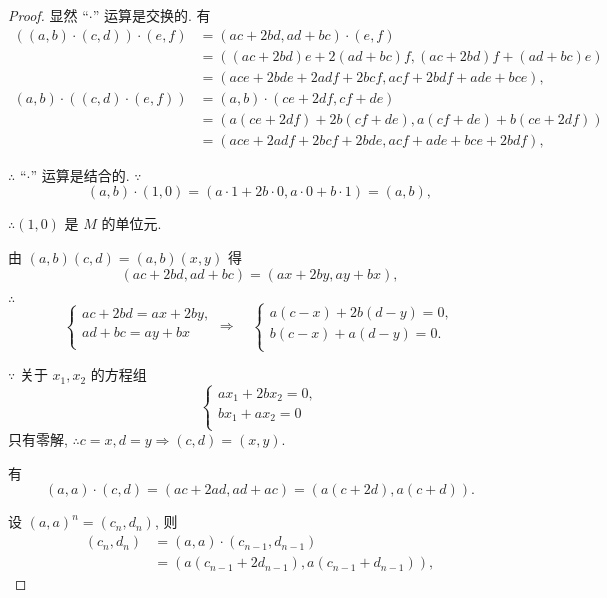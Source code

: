 \documentclass[color=black,device=normal,lang=cn,mode=geye]{elegantnote}
\begin{document}
\begin{proof}
    显然 ``$\cdot$'' 运算是交换的. 有
    \begin{align*}
        ((a,b)\cdot(c,d))\cdot(e,f) & =(ac+2bd,ad+bc)\cdot(e,f) \\
        & =((ac+2bd)e+2(ad+bc)f,(ac+2bd)f+(ad+bc)e) \\
        & =(ace+2bde+2adf+2bcf,acf+2bdf+ade+bce),
    \end{align*}
    \begin{align*}
        (a,b)\cdot((c,d)\cdot(e,f)) & =(a,b)\cdot(ce+2df,cf+de) \\
        & =(a(ce+2df)+2b(cf+de),a(cf+de)+b(ce+2df)) \\
        & =(ace+2adf+2bcf+2bde,acf+ade+bce+2bdf),
    \end{align*}

    $\therefore$ ``$\cdot$'' 运算是结合的. $\because$
    \[(a,b)\cdot(1,0)=(a\cdot1+2b\cdot0,a\cdot0+b\cdot1)=(a,b),\]

    $\therefore(1,0)$ 是 $M$ 的单位元.

    由 $(a,b)(c,d)=(a,b)(x,y)$ 得
    \[(ac+2bd,ad+bc)=(ax+2by,ay+bx),\]

    $\therefore$
    \[\begin{cases}
        ac+2bd=ax+2by, \\
        ad+bc=ay+bx \\
    \end{cases}\Rightarrow\quad\begin{cases}
        a(c-x)+2b(d-y)=0, \\
        b(c-x)+a(d-y)=0. \\
    \end{cases}\]

    $\because$ 关于 $x_1,x_2$ 的方程组
    \[\begin{cases}
        ax_1+2bx_2=0, \\
        bx_1+ax_2=0 \\
    \end{cases}\]
    只有零解, $\therefore c=x,d=y\Rightarrow(c,d)=(x,y)$.

    有
    \[(a,a)\cdot(c,d)=(ac+2ad,ad+ac)=(a(c+2d),a(c+d)).\]

    设 $(a,a)^n=(c_n,d_n)$, 则
    \begin{align*}
        (c_n,d_n) & =(a,a)\cdot(c_{n-1},d_{n-1}) \\
        & =(a(c_{n-1}+2d_{n-1}),a(c_{n-1}+d_{n-1})),
    \end{align*}


\end{proof}
\end{document}

